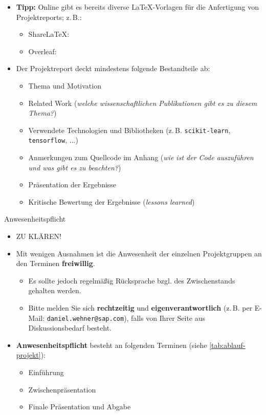 \begin{frame}
	\begin{itemize}
		\item \textbf{Tipp:} Online gibt es bereits diverse \LaTeX-Vorlagen für die Anfertigung von Projektreports; z.\,B.:
		\begin{itemize}
			\item ShareLaTeX: \sharelatex
			\item Overleaf: \overleaf
		\end{itemize}
		\item Der Projektreport deckt mindestens folgende Bestandteile ab:
		\begin{itemize}
			\item Thema und Motivation
			\item Related Work (\textit{welche wissenschaftlichen Publikationen gibt es zu diesem Thema?})
			\item Verwendete Technologien und Bibliotheken (z.\,B. \texttt{scikit-learn}, \texttt{tensorflow}, ...)
			\item Anmerkungen zum Quellcode im Anhang (\textit{wie ist der Code auszuführen und was gibt es zu beachten?})
			\item Präsentation der Ergebnisse
			\item Kritische Bewertung der Ergebnisse (\textit{\glqq{}lessons learned\grqq{}})
		\end{itemize}
	\end{itemize}

\end{frame}


\begin{dwHeaderFrame}{Anwesenheitspflicht}
	\begin{itemize}
		\item ZU KLÄREN!
		\item Mit wenigen Ausnahmen ist die Anwesenheit der einzelnen Projektgruppen an den Terminen \textbf{freiwillig}.
		\begin{itemize}
			\item Es sollte jedoch regelmäßig Rücksprache bzgl. des Zwischenstands gehalten werden.
			\item Bitte melden Sie sich \textbf{rechtzeitig} und \textbf{eigenverantwortlich} (z.\,B. per E-Mail: \texttt{daniel.wehner@sap.com}), falls von Ihrer Seite aus Diskussionsbedarf besteht.
		\end{itemize}
		\item \textbf{Anwesenheitspflicht} besteht an folgenden Terminen (siehe \cref{tab:ablauf-projekt}):
		\begin{itemize}
			\item Einführung
			\item Zwischenpräsentation
			\item Finale Präsentation und Abgabe
		\end{itemize}
	\end{itemize}
\end{dwHeaderFrame}


